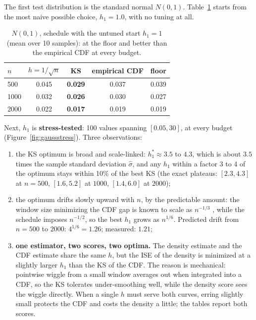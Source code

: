 \documentclass[11pt]{article}
\newcommand{\shat}{\hat{\sigma}}
\begin{document}
The first test distribution is the standard normal $N(0,1)$. Table~\ref{tab:gauss-start}
starts from the most naive possible choice, $h_1 = 1.0$, with no tuning at all.

\begin{table}[H]
\centering
\begin{tabular}{lcccc}
\toprule
$n$ & $h = 1/\sqrt{n}$ & KS & empirical CDF & floor \\
\midrule
500  & 0.045 & \textbf{0.029} & 0.037 & 0.039 \\
1000 & 0.032 & \textbf{0.026} & 0.030 & 0.027 \\
2000 & 0.022 & \textbf{0.017} & 0.019 & 0.019 \\
\bottomrule
\end{tabular}
\caption{$N(0,1)$, schedule with the untuned start $h_1 = 1$ (mean over 10 samples): at the
floor and better than the empirical CDF at every budget.}
\label{tab:gauss-start}
\end{table}

Next, $h_1$ is \textbf{stress-tested}: 100 values spanning $[0.05, 30]$, at every budget
(Figure~\ref{fig:gaussstress}). Three observations:

\begin{enumerate}
  \item the KS optimum is broad and scale-linked: $h_1^* \approx 3.5$ to $4.3$, which is
        about $3.5$ times the sample standard deviation $\shat$, and any $h_1$ within a
        factor 3 to 4 of the optimum stays within 10\% of the best KS (the exact plateaus:
        $[2.3, 4.3]$ at $n = 500$, $[1.6, 5.2]$ at $1000$, $[1.4, 6.0]$ at $2000$);
  \item the optimum drifts slowly upward with $n$, by the predictable amount: the window
        size minimizing the CDF gap is known to scale as $n^{-1/3}$ \cite{azzalini1981},
        while the schedule imposes $n^{-1/2}$, so the best $h_1$ grows as $n^{1/6}$.
        Predicted drift from $n = 500$ to $2000$: $4^{1/6} = 1.26$; measured: $1.21$;
  \item \textbf{one estimator, two scores, two optima.} The density estimate and the CDF
        estimate share the same $h$, but the ISE of the density is minimized at a slightly
        larger $h_1$ than the KS of the CDF. The reason is mechanical: pointwise wiggle
        from a small window averages out when integrated into a CDF, so the KS tolerates
        under-smoothing well, while the density score sees the wiggle directly. When a
        single $h$ must serve both curves, erring slightly small protects the CDF and costs
        the density a little; the tables report both scores.
\end{enumerate}
\end{document}
